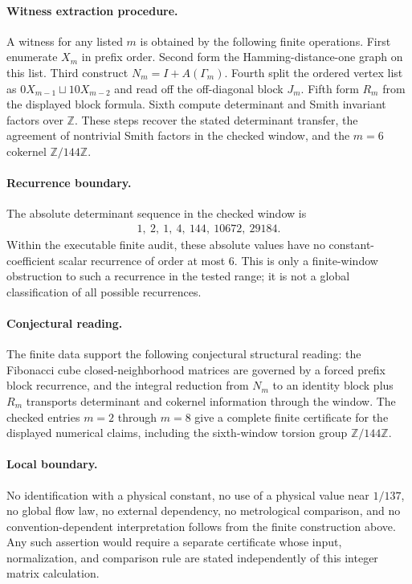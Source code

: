 \paragraph{Witness extraction procedure.}
A witness for any listed $m$ is obtained by the following finite operations. First enumerate $X_m$ in prefix order. Second form the Hamming-distance-one graph on this list. Third construct $N_m=I+A(\Gamma_m)$. Fourth split the ordered vertex list as $0X_{m-1}\sqcup 10X_{m-2}$ and read off the off-diagonal block $J_m$. Fifth form $R_m$ from the displayed block formula. Sixth compute determinant and Smith invariant factors over $\mathbb{Z}$. These steps recover the stated determinant transfer, the agreement of nontrivial Smith factors in the checked window, and the $m=6$ cokernel $\mathbb{Z}/144\mathbb{Z}$.

\paragraph{Recurrence boundary.}
The absolute determinant sequence in the checked window is
$$
\begin{aligned}
1,\ 2,\ 1,\ 4,\ 144,\ 10672,\ 29184.
\end{aligned}
$$
Within the executable finite audit, these absolute values have no constant-coefficient scalar recurrence of order at most $6$. This is only a finite-window obstruction to such a recurrence in the tested range; it is not a global classification of all possible recurrences.

\paragraph{Conjectural reading.}
The finite data support the following conjectural structural reading: the Fibonacci cube closed-neighborhood matrices are governed by a forced prefix block recurrence, and the integral reduction from $N_m$ to an identity block plus $R_m$ transports determinant and cokernel information through the window. The checked entries $m=2$ through $m=8$ give a complete finite certificate for the displayed numerical claims, including the sixth-window torsion group $\mathbb{Z}/144\mathbb{Z}$.

\paragraph{Local boundary.}
No identification with a physical constant, no use of a physical value near $1/137$, no global flow law, no external dependency, no metrological comparison, and no convention-dependent interpretation follows from the finite construction above. Any such assertion would require a separate certificate whose input, normalization, and comparison rule are stated independently of this integer matrix calculation.
